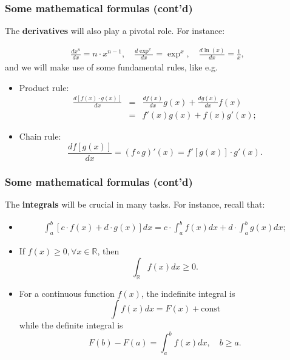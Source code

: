 \documentclass[notes=show,handout]{beamer}
\newcommand{\bea}{\begin{eqnarray}}
\newcommand{\eea}{\end{eqnarray}}
\newcommand{\nn}{\nonumber}
\begin{document}
\begin{frame}
\frametitle{Some mathematical formulas (cont'd)}

The \textbf{derivatives} will also play a pivotal role. For instance:

\bea
 \frac{d x^n}{dx} = n \cdot x^{n-1}, \quad \frac{d \exp^{x}}{dx} = \exp^{x} , \quad
\frac{d \ln({x})}{dx} = \frac{1}{x}, \nn
\eea
and we will make use of some fundamental rules, like e.g.

\begin{itemize}
\item Product rule:
\bea
\frac{d [f(x)\cdot g(x)]}{dx} &=& \frac{df(x)}{dx} g(x) + \frac{dg(x)}{dx} f(x) \nn \\
&=& f'(x) g(x)+ f(x) g'(x) \nn ;
\eea
\item Chain rule: $$ \frac{d f[g(x)]}{dx} =  (f\circ g)'(x) = f'[g(x)] \cdot g'(x). $$
\end{itemize}
\end{frame}


\begin{frame}
\frametitle{Some mathematical formulas (cont'd)}

The \textbf{integrals} will be crucial in many tasks. For instance, recall that:

\begin{itemize}
\item \bea
\int_{a}^{b} \left[c \cdot f(x) + d \cdot g(x) \right]dx = c  \cdot \int_{a}^{b}   f(x) dx + d \cdot \int_{a}^{b}   g(x) dx; \nn
\eea
\item If $f(x) \geq 0, \forall x \in \mathbb{R}$, then
$$ \int_{\mathbb{R}} f(x) dx \geq 0. $$
\item For a continuous function $f(x)$, the indefinite integral is
$$
\int f(x) dx = F(x) + \text{const}
$$
while the definite integral is
$$
F(b)-F(a)= \int_{a}^{b} f(x) dx, \quad b \geq a.
$$
\end{itemize}
\end{frame}
\end{document}
